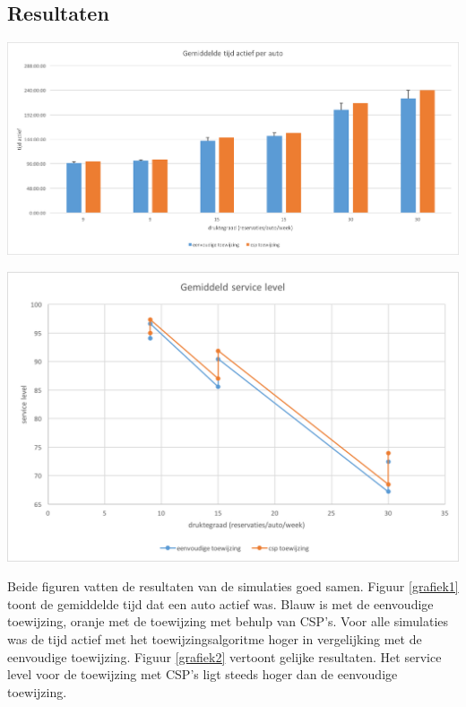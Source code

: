 \documentclass[a0,portrait]{a0poster}
\begin{document}
\begin{multicols}{2}
\color{HoGentAccent1} 
\section*{Resultaten}
\color{black}


\begin{center}\vspace{1cm}
\includegraphics[width=1.0\linewidth]{grafiek-gemiddelde-tijd-actief-per-auto.png}
\label{grafiek1}
\end{center}\vspace{1cm}
\begin{center}\vspace{1cm}
	\includegraphics[width=1.0\linewidth]{grafiek-gemiddeld-service-level.png}
	\label{grafiek2}
\end{center}\vspace{1cm}
Beide figuren vatten de resultaten van de simulaties goed samen. Figuur  \ref{grafiek1} toont de gemiddelde tijd dat een auto actief was. Blauw is met de eenvoudige toewijzing, oranje met de toewijzing met behulp van CSP's. Voor alle simulaties was de tijd actief met het toewijzingsalgoritme hoger in vergelijking met de eenvoudige toewijzing. Figuur \ref{grafiek2} vertoont gelijke resultaten. Het service level voor de toewijzing met CSP's ligt steeds hoger dan de eenvoudige toewijzing.


\end{multicols}
\end{document}
